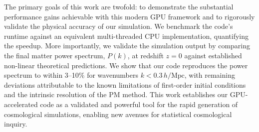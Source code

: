 \documentclass[]{article}
\begin{document}
The primary goals of this work are twofold: to demonstrate the substantial performance gains achievable with this modern GPU framework and to rigorously validate the physical accuracy of our simulation. We benchmark the code's runtime against an equivalent multi-threaded CPU implementation, quantifying the speedup. More importantly, we validate the simulation output by comparing the final matter power spectrum, $P(k)$, at redshift $z=0$ against established non-linear theoretical predictions. We show that our code reproduces the power spectrum to within 3--10\% for wavenumbers $k < 0.3 \, h/\text{Mpc}$, with remaining deviations attributable to the known limitations of first-order initial conditions and the intrinsic resolution of the PM method. This work establishes our GPU-accelerated code as a validated and powerful tool for the rapid generation of cosmological simulations, enabling new avenues for statistical cosmological inquiry.
\end{document}
